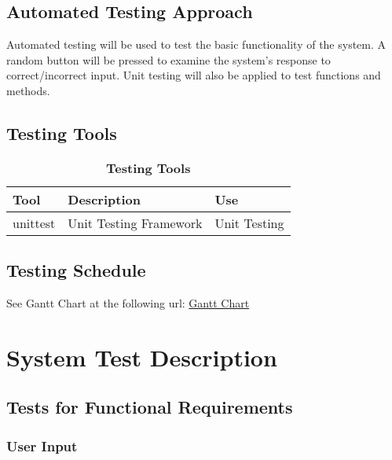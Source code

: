 \documentclass[12pt, titlepage]{article}
\begin{document}
\subsection{Automated Testing Approach}
Automated testing will be used to test the basic functionality of the system. A random button will be pressed to examine the system's response to correct/incorrect input. Unit testing will also be applied to test functions and methods.

\subsection{Testing Tools}
\begin{table}[h]
\caption{\bf Testing Tools}
\begin{tabularx}{\textwidth}{p{3cm}p{6cm}X}
\toprule {\bf Tool} & {\bf Description} & {\bf Use}\\
\midrule
unittest & Unit Testing Framework & Unit Testing \\
\bottomrule
\end{tabularx}
\end{table}

\subsection{Testing Schedule}

See Gantt Chart at the following url:
\href{run:GanttChart.gan} {Gantt Chart}\\
\section{System Test Description}
	
\subsection{Tests for Functional Requirements}

\subsubsection{User Input}
		
\end{document}
